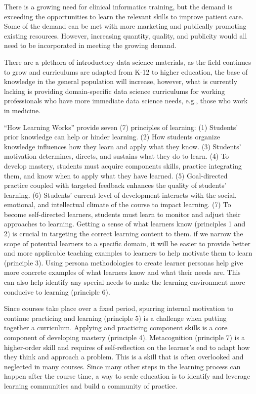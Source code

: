 \documentclass[030-workshop.tex]{subfiles}
\begin{document}
    There is a growing need for clinical informatics training,
    but the demand is exceeding the opportunities to learn the relevant skills to improve patient care.
    Some of the demand can be met with more marketing and publically promoting existing resources.
    However, increasing quantity, quality, and publicity would all need to be incorporated
    in meeting the growing demand.

    There are a plethora of introductory data science materials,
    as the field continues to grow and curriculums are adapted from K-12 to higher education,
    the base of knowledge in the general population will increase,
    however, what is currently lacking is providing domain-specific data science curriculums
    for working professionals who have more immediate data science needs, e.g., those who work in medicine.

    ``How Learning Works'' provide seven (7) principles of learning:
    (1) Students' prior knowledge can help or hinder learning.
    (2) How students organize knowledge influences how they learn and apply what they know.
    (3) Students' motivation determines, directs, and sustains what they do to learn.
    (4) To develop mastery, students must acquire components skills, practice integrating them, and know when to apply what they have learned.
    (5) Goal-directed practice coupled with targeted feedback enhances the quality of students' learning.
    (6) Students' current level of development interacts with the social, emotional, and intellectual climate of the course to impact learning.
    (7) To become self-directed learners, students must learn to monitor and adjust their approaches to learning.
    Getting a sense of what learners know (principles 1 and 2) is crucial in targeting
    the correct learning content to them.
    if we narrow the scope of potential learners to a specific domain,
    it will be easier to provide better and more applicable teaching examples to learners
    to help motivate them to learn (principle 3).
    Using persona methodologies to create learner personas help give more concrete examples
    of what learners know and what their needs are.
    This can also help identify any special needs to make the learning environment more conducive to learning (principle 6).

    Since courses take place over a fixed period,
    spurring internal motivation to continue practicing and learning (principle 5) is a challenge when putting together a curriculum.
    Applying and practicing component skills is a core component of developing mastery (principle 4).
    Metacognition (principle 7) is a higher-order skill and requires of self-reflection on the learner's end
    to adapt how they think and approach a problem.
    This is a skill that is often overlooked and neglected in many courses.
    Since many other steps in the learning process can happen after the course time,
    a way to scale education is to identify and leverage learning communities
    and build a community of practice. %
\end{document}

